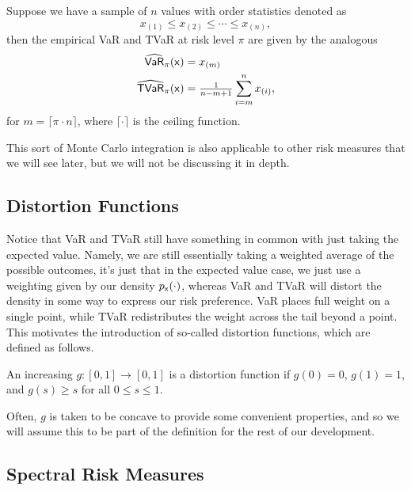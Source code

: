 \begin{example}
    Suppose we have a sample of $n$ values with order statistics denoted as
    \begin{equation}
        x_{(1)} \le x_{(2)} \le \cdots\le  x_{(n)},
    \end{equation}
    then the empirical VaR and TVaR at risk level $\pi$ are given by the analogous
    \begin{align}
        \eVaR{\pi}{\rx} &= x_{(m)} \\
        \eTVaR{\pi}{\rx} &= \tfrac{1}{n - m+1}\sum_{i=m}^{n} x_{(i)} ,
    \end{align}
    for $m=\lceil \pi\cdot n\rceil$, where $\lceil\cdot\rceil$ is the ceiling function.
\end{example}

This sort of Monte Carlo integration is also applicable to other risk measures that we will see later, but we will not be discussing it in depth.

\subsection{Distortion Functions}

Notice that VaR and TVaR still have something in common with just taking the expected value. Namely, we are still essentially taking a weighted average of the possible outcomes, it's just that in the expected value case, we just use a weighting given by our density $\pxdd$, whereas VaR and TVaR will distort the density in some way to express our risk preference. VaR places full weight on a single point, while TVaR redistributes the weight across the tail beyond a point. This motivates the introduction of so-called distortion functions, which are defined as follows.

\begin{definition}
    An increasing $g:[0,1]\to[0,1]$ is a distortion function if $g(0)=0$, $g(1)=1$, and $g(s)\ge s$ for all $0\le s\le 1$. 
\end{definition}

Often, $g$ is taken to be concave to provide some convenient properties, and so we will assume this to be part of the definition for the rest of our development. 

\subsection{Spectral Risk Measures}

